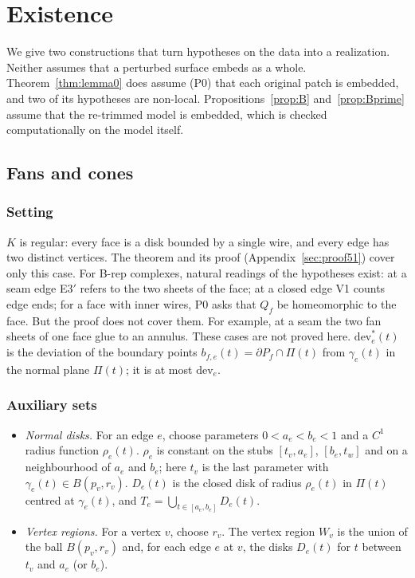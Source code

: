 \section{Existence}\label{sec:existence}

We give two constructions that turn hypotheses on the data into a realization. Neither assumes that a perturbed
surface embeds as a whole. Theorem~\ref{thm:lemma0} does assume (P0) that each original patch is embedded, and two
of its hypotheses are non-local. Propositions~\ref{prop:B} and~\ref{prop:Bprime} assume that the re-trimmed model is
embedded, which is checked computationally on the model itself.

\subsection{Fans and cones}\label{sec:fans}

\subsubsection*{Setting}
$K$ is regular: every face is a disk bounded by a single wire, and every edge has two distinct vertices. The theorem
and its proof (Appendix~\ref{sec:proof51}) cover only this case. For B-rep complexes, natural readings of the
hypotheses exist: at a seam edge E3$'$ refers to the two sheets of the face; at a closed edge V1 counts edge ends; for
a face with inner wires, P0 asks that $Q_f$ be homeomorphic to the face. But the proof does not cover them. For
example, at a seam the two fan sheets of one face glue to an annulus. These cases are not proved here.
$\mathrm{dev}^*_e(t)$ is the deviation of the boundary points $b_{f,e}(t)=\partial P_f\cap\Pi(t)$ from $\gamma_e(t)$ in
the normal plane $\Pi(t)$; it is at most $\mathrm{dev}_e$.

\subsubsection*{Auxiliary sets}
\begin{itemize}
\item \emph{Normal disks.} For an edge $e$, choose parameters $0<a_e<b_e<1$ and a $C^1$ radius function $\rho_e(t)$.
$\rho_e$ is constant on the stubs $[t_v,a_e]$, $[b_e,t_w]$ and on a neighbourhood of $a_e$ and $b_e$; here $t_v$ is
the last parameter with $\gamma_e(t)\in B(p_v,r_v)$. $D_e(t)$ is the closed disk of radius $\rho_e(t)$ in $\Pi(t)$
centred at $\gamma_e(t)$, and $T_e=\bigcup_{t\in[a_e,b_e]}D_e(t)$.
\item \emph{Vertex regions.} For a vertex $v$, choose $r_v$. The vertex region $W_v$ is the union of the ball
$B(p_v,r_v)$ and, for each edge $e$ at $v$, the disks $D_e(t)$ for $t$ between $t_v$ and $a_e$ (or $b_e$).
\end{itemize}


